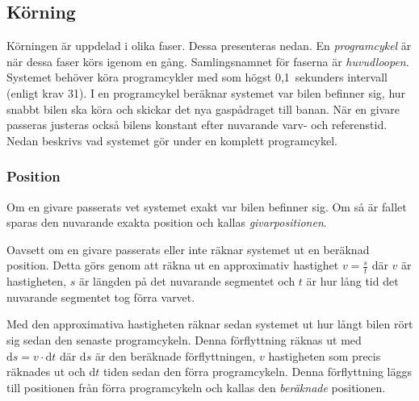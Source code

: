 \subsection{Körning}
\label{sec:systembeskrivning:korning}

Körningen är uppdelad i olika faser. Dessa presenteras nedan. En
\emph{programcykel} är när dessa faser körs igenom en gång. Samlingsnamnet för
faserna är \emph{huvudloopen}. Systemet behöver köra programcykler med som högst
0,1~sekunders intervall (enligt krav 31). I en programcykel beräknar systemet
var bilen befinner sig, hur snabbt bilen ska köra och skickar det nya
gaspådraget till banan. När en givare passeras justeras också bilens konstant
efter nuvarande varv- och referenstid.  Nedan beskrivs vad systemet gör under en
komplett programcykel.

\subsubsection{Position}
\label{sec:system:korning:position}

Om en givare passerats vet systemet exakt var bilen befinner sig. Om så är
fallet sparas den nuvarande exakta position och kallas \emph{givarpositionen}.


Oavsett om en givare passerats eller inte räknar systemet ut en beräknad
position. Detta görs genom att räkna ut en approximativ hastighet $v =
\frac{s}{t}$ där $v$ är hastigheten, $s$ är längden på det nuvarande segmentet
och $t$ är hur lång tid det nuvarande segmentet tog förra varvet.


Med den approximativa hastigheten räknar sedan systemet ut hur långt bilen rört
sig sedan den senaste programcykeln. Denna förflyttning räknas ut med $\mathrm{d}s
= v \cdot \mathrm{d}t$ där $\mathrm{d}s$ är den beräknade förflyttningen, $v$
hastigheten som precis räknades ut och $\mathrm{d}t$ tiden sedan den förra
programcykeln. Denna förflyttning läggs till positionen från förra programcykeln
och kallas den \emph{beräknade} positionen.

